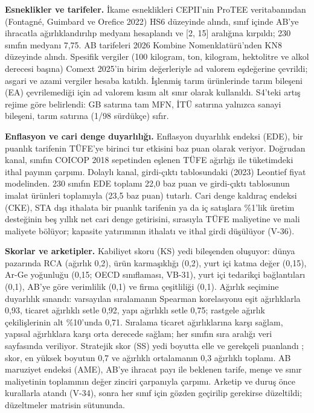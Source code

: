 \textbf{Esneklikler ve tarifeler.} İkame esneklikleri CEPII'nin ProTEE veritabanından (Fontagné, Guimbard ve Orefice 2022) HS6 düzeyinde alındı, sınıf içinde AB'ye ihracatla ağırlıklandırılıp medyanı hesaplandı ve {[}2, 15{]} aralığına kırpıldı; 230 sınıfın medyanı 7,75. AB tarifeleri 2026 Kombine Nomenklatürü'nden KN8 düzeyinde alındı. Spesifik vergiler (100 kilogram, ton, kilogram, hektolitre ve alkol derecesi başına) Comext 2025'in birim değerleriyle ad valorem eşdeğerine çevrildi; asgari ve azami vergiler hesaba katıldı. İşlenmiş tarım ürünlerinde tarım bileşeni (EA) çevrilemediği için ad valorem kısım alt sınır olarak kullanıldı. S4'teki artış rejime göre belirlendi: GB satırına tam MFN, İTÜ satırına yalnızca sanayi bileşeni, tarım satırına (1/98 sürdükçe) sıfır.

\textbf{Enflasyon ve cari denge duyarlılığı.} Enflasyon duyarlılık endeksi (EDE), bir puanlık tarifenin TÜFE'ye birinci tur etkisini baz puan olarak veriyor. Doğrudan kanal, sınıfın COICOP 2018 sepetinden eşlenen TÜFE ağırlığı ile tüketimdeki ithal payının çarpımı. Dolaylı kanal, girdi-çıktı tablosundaki (2023) Leontief fiyat modelinden. 230 sınıfın EDE toplamı 22,0 baz puan ve girdi-çıktı tablosunun imalat ürünleri toplamıyla (23,5 baz puan) tutarlı. Cari denge kaldıraç endeksi (CKE), STA dışı ithalata bir puanlık tarifenin ya da iç satışlara \%1'lik üretim desteğinin beş yıllık net cari denge getirisini, sırasıyla TÜFE maliyetine ve mali maliyete bölüyor; kapasite yatırımının ithalatı ve ithal girdi düşülüyor (V-36).

\textbf{Skorlar ve arketipler.} Kabiliyet skoru (KS) yedi bileşenden oluşuyor: dünya pazarında RCA (ağırlık 0,2), ürün karmaşıklığı (0,2), yurt içi katma değer (0,15), Ar-Ge yoğunluğu (0,15; OECD sınıflaması, VB-31), yurt içi tedarikçi bağlantıları (0,1), AB'ye göre verimlilik (0,1) ve firma çeşitliliği (0,1). Ağırlık seçimine duyarlılık sınandı: varsayılan sıralamanın Spearman korelasyonu eşit ağırlıklarla 0,93, ticaret ağırlıklı setle 0,92, yapı ağırlıklı setle 0,75; rastgele ağırlık çekilişlerinin alt \%10'unda 0,71. Sıralama ticaret ağırlıklarına karşı sağlam, yapısal ağırlıklara karşı orta derecede sağlam; her sınıfın sıra aralığı veri sayfasında veriliyor. Stratejik skor (SS) yedi boyutta elle ve gerekçeli puanlandı \etiketH{}; skor, en yüksek boyutun 0,7 ve ağırlıklı ortalamanın 0,3 ağırlıklı toplamı. AB maruziyet endeksi (AME), AB'ye ihracat payı ile beklenen tarife, menşe ve sınır maliyetinin toplamının değer zinciri çarpanıyla çarpımı. Arketip ve duruş önce kurallarla atandı (V-34), sonra her sınıf için gözden geçirilip gerekirse düzeltildi; düzeltmeler matrisin  sütununda.

